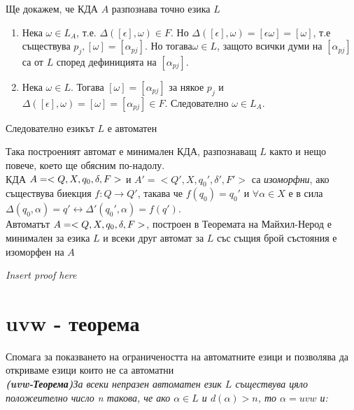 \documentclass[11pt]{article} %
\begin{document}
Ще докажем, че КДА $A$ разпознава точно езика $L$\\
\renewcommand{\theenumi}{\alph{enumi}}

\begin{enumerate}
	\item Нека $\omega \in L_{A}$, т.е. $\Delta([\epsilon], \omega) 			\in F. \text{ Но } \Delta([\epsilon], \omega) = [\epsilon 				\omega] = [\omega]$, т.е съществува $p_{j}, [\omega] = 					[\alpha_{pj}]$. Но тогава$\omega \in L$, защото всички думи 			на $[\alpha_{pj}]$ са от $L$ според дефиницията на $					[\alpha_{pj}]$.\\
	\item Нека $\omega \in L$. Тогава $[\omega] = [\alpha_{pj}]$ за 			някое $p_{j}$ и $\Delta([\epsilon], \omega) = [\omega] = 				[\alpha_{pj}]\in F$. Следователно $\omega \in L_{A}$. \\
\end{enumerate}\par

	Следователно езикът $L$ е автоматен \par
	Така построеният автомат е минимален КДА, разпознаващ $L$ както и нещо повече, което ще обясним по-надолу.\\
	 КДА $A = <Q, X, q_{0}, \delta, F>$ и $A' = < Q', X, q_{0}', \delta', F'>$ са \emph{изоморфни}, ако съществува биекция $f : Q \to Q'$, такава че $f(q_{0}) = q_{0}'$ и $\forall \alpha \in X$ е в сила $\Delta(q_{0}, \alpha) = q' \leftrightarrow \Delta'(q_{0}', \alpha) = f(q')$. \\
	\theorem Автоматът $A = <Q, X, q_{0}, \delta, F>$, построен в Теоремата на Майхил-Нерод е минимален за езика $L$ и всеки друг автомат за $L$ със същия брой състояния е изоморфен на $A$\\
	\centerline{\emph{Insert proof here}}

\section{uvw - теорема}
Спомага за показването на ограничеността на автоматните езици  и позволява да откриваме езици които не са автоматни\\
\theorem \emph{\textbf{(uvw-Теорема)}За всеки непразен автоматен език $L$ съществува цяло положеително число n такова, че ако $\alpha \in L$ и $d(\alpha) > n$, то $\alpha = uvw$ и:}\\   
\renewcommand{\theenumi}{\arabic{enumi}}
\end{document}
